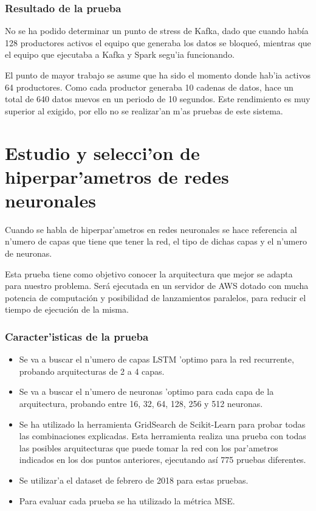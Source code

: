\subsubsection*{Resultado de la prueba}

No se ha podido determinar un punto de stress de Kafka, dado que cuando había 128 productores activos el equipo que generaba los datos se bloqueó, mientras que el equipo que ejecutaba a Kafka y Spark segu'ia funcionando.

El punto de mayor trabajo se asume que ha sido el momento donde hab'ia activos 64 productores. Como cada productor generaba 10 cadenas de datos, hace un total de 640 datos nuevos en un periodo de 10 segundos. Este rendimiento es muy superior al exigido, por ello no se realizar'an m'as pruebas de este sistema.



\section{Estudio y selecci'on de hiperpar'ametros de redes neuronales}\label{sec:pruebahiperparametros}

Cuando se habla de hiperpar'ametros en redes neuronales se hace referencia al n'umero de capas que tiene que tener la red, el tipo de dichas capas y el n'umero de neuronas.

Esta prueba tiene como objetivo conocer la arquitectura que mejor se adapta para nuestro problema. Será ejecutada en un servidor de AWS dotado con mucha potencia de computación y posibilidad de lanzamientos paralelos, para reducir el tiempo de ejecución de la misma.



\subsubsection*{Caracter'isticas de la prueba}
\begin{itemize}
\item Se va a buscar el n'umero de capas LSTM 'optimo para la red recurrente, probando arquitecturas de 2 a 4 capas.
\item Se va a buscar el n'umero de neuronas 'optimo para cada capa de la arquitectura, probando entre 16, 32, 64, 128, 256 y 512 neuronas. 
\item Se ha utilizado la herramienta GridSearch de Scikit-Learn para probar todas las combinaciones explicadas. Esta herramienta realiza una prueba con todas las posibles arquitecturas que puede tomar la red con los par'ametros indicados en los dos puntos anteriores, ejecutando así 775 pruebas diferentes.
\item Se utilizar'a el dataset de febrero de 2018 para estas pruebas.
\item Para evaluar cada prueba se ha utilizado la métrica MSE.
\end{itemize}


